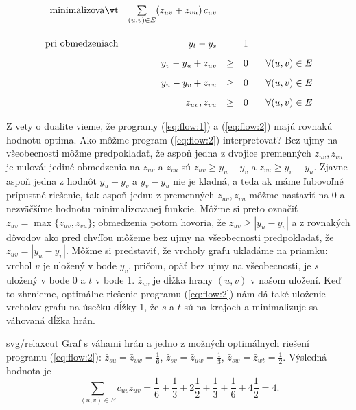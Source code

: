 \begin{equation}
  \label{eq:flow:2}
  \begin{array}{rrcll}
    {\rm minimalizovať}     & \multicolumn{1}{r}{\sum\limits_{(u,v)\in E}(z_{uv}+z_{vu})\,c_{uv}}\\[8mm]
    {\rm pri\ obmedzeniach} & y_t - y_s  &=&1&  \\[3mm]
                            & y_v - y_u + z_{uv} &\ge&0&\;\;\;    \forall (u,v)\in E \\[3mm]
                            & y_u - y_v + z_{vu} &\ge&0&\;\;\;    \forall (u,v)\in E \\[3mm]
                            & z_{uv},z_{vu}&\ge& 0 &  \;\;\;\forall (u,v)\in E\\
  \end{array}
\end{equation}  

\noindent
Z vety o dualite vieme, že programy (\ref{eq:flow:1}) a (\ref{eq:flow:2}) majú rovnakú hodnotu optima. 
Ako môžme program (\ref{eq:flow:2}) interpretovať? 
Bez ujmy na všeobecnosti môžme predpokladať, že aspoň jedna z dvojice premenných $z_{uv},z_{vu}$
je nulová: jediné obmedzenia na $z_{uv}$ a $z_{vu}$
sú $z_{uv}\ge y_u-y_v$ a $z_{vu}\ge y_v-y_u$. Zjavne aspoň jedna z hodnôt $y_u-y_v$ a $y_v-y_u$
nie je kladná, a teda ak máme ľubovoľné prípustné riešenie, tak aspoň jednu z premenných 
$z_{uv},z_{vu}$ môžme nastaviť na 0 a nezväčšíme hodnotu minimalizovanej funkcie. 
Môžme si preto označiť $\bar{z}_{uv}=\max\{z_{uv},z_{vu}\}$; obmedzenia potom hovoria, že
$\bar{z}_{uv}\ge|y_u-y_v|$ a z rovnakých dôvodov ako pred chvíľou môžeme bez ujmy na všeobecnosti
predpokladať, že $\bar{z}_{uv}=|y_u-y_v|$. Môžme si predstaviť, že vrcholy grafu ukladáme 
na priamku: vrchol $v$ je uložený v bode $y_v$, pričom, opäť bez ujmy na všeobecnosti, je $s$ uložený
v bode 0 a $t$ v bode 1. $\bar{z}_{uv}$ je dĺžka hrany $(u,v)$ v našom uložení.
Keď to zhrnieme, optimálne riešenie programu (\ref{eq:flow:2}) nám dá také uloženie vrcholov grafu na 
úsečku dĺžky 1, že $s$ a $t$
sú na krajoch a minimalizuje sa váhovaná dĺžka hrán.

\begin{myfig}{0.9\textwidth}{svg/relaxcut}
  Graf s váhami hrán a jedno z možných optimálnych riešení programu (\ref{eq:flow:2}):
  $\bar{z}_{su}=\bar{z}_{vw}=\frac{1}{6}$, $\bar{z}_{sv}=\bar{z}_{uw}=\frac{1}{3}$,
  $\bar{z}_{sw}=\bar{z}_{wt}=\frac{1}{2}$. Výsledná hodnota je
  $$\sum_{(u,v)\in E}c_{uv}\bar{z}_{uv}=\frac{1}{6}+\frac{1}{3}+2\frac{1}{2}+\frac{1}{3}+\frac{1}{6}+4\frac{1}{2}=4.$$
\end{myfig}

